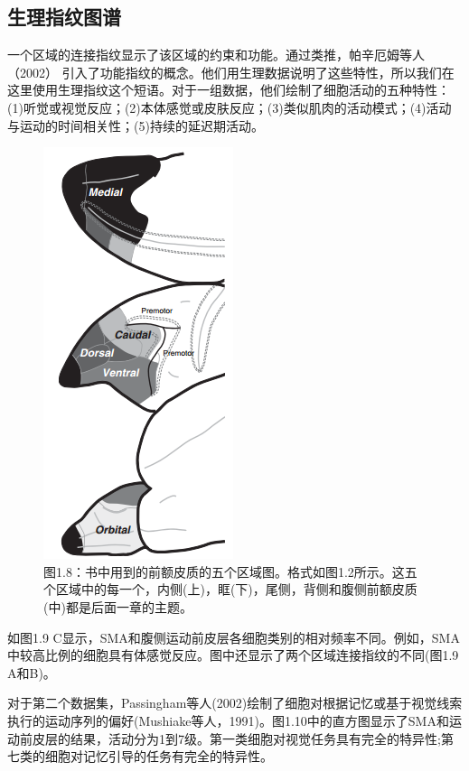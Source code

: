 \subsection{生理指纹图谱}
一个区域的连接指纹显示了该区域的约束和功能。通过类推，帕辛厄姆等人（2002） 引入了功能指纹的概念。他们用生理数据说明了这些特性，所以我们在这里使用生理指纹这个短语。对于一组数据，他们绘制了细胞活动的五种特性： (1)听觉或视觉反应；(2)本体感觉或皮肤反应；(3)类似肌肉的活动模式；(4)活动与运动的时间相关性；(5)持续的延迟期活动。

\begin{figure}[!htb]
	\centering
	\includegraphics[width=0.5\linewidth]{image_pfc/Fig_1_8}
	\caption*{图1.8：书中用到的前额皮质的五个区域图。格式如图1.2所示。这五个区域中的每一个，内侧(上)，眶(下)，尾侧，背侧和腹侧前额皮质(中)都是后面一章的主题。	}
\end{figure}

\par
如图1.9 C显示，SMA和腹侧运动前皮层各细胞类别的相对频率不同。例如，SMA中较高比例的细胞具有体感觉反应。图中还显示了两个区域连接指纹的不同(图1.9 A和B)。
\par
对于第二个数据集，Passingham等人(2002)绘制了细胞对根据记忆或基于视觉线索执行的运动序列的偏好(Mushiake等人，1991)。图1.10中的直方图显示了SMA和运动前皮层的结果，活动分为1到7级。第一类细胞对视觉任务具有完全的特异性;第七类的细胞对记忆引导的任务有完全的特异性。

